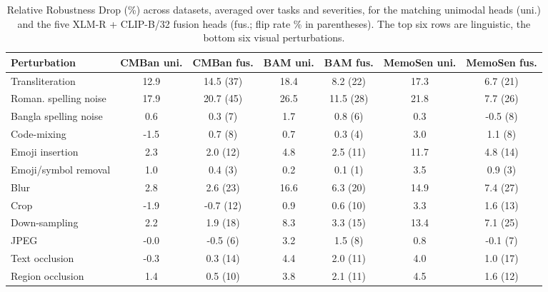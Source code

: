 \begin{table}[t]
\centering
\small
\caption{Relative Robustness Drop (\%) across datasets, averaged over tasks and severities, for the matching unimodal heads (uni.) and the five XLM-R + CLIP-B/32 fusion heads (fus.; flip rate \% in parentheses). The top six rows are linguistic, the bottom six visual perturbations.}
\label{tab:cross_rob}
\begin{adjustbox}{max width=\textwidth}
\begin{tabular}{lcccccc}
\toprule
Perturbation & CMBan uni. & CMBan fus. & BAM uni. & BAM fus. & MemoSen uni. & MemoSen fus. \\
\midrule
Transliteration & 12.9 & 14.5 (37) & 18.4 & 8.2 (22) & 17.3 & 6.7 (21) \\
Roman. spelling noise & 17.9 & 20.7 (45) & 26.5 & 11.5 (28) & 21.8 & 7.7 (26) \\
Bangla spelling noise & 0.6 & 0.3 (7) & 1.7 & 0.8 (6) & 0.3 & -0.5 (8) \\
Code-mixing & -1.5 & 0.7 (8) & 0.7 & 0.3 (4) & 3.0 & 1.1 (8) \\
Emoji insertion & 2.3 & 2.0 (12) & 4.8 & 2.5 (11) & 11.7 & 4.8 (14) \\
Emoji/symbol removal & 1.0 & 0.4 (3) & 0.2 & 0.1 (1) & 3.5 & 0.9 (3) \\
Blur & 2.8 & 2.6 (23) & 16.6 & 6.3 (20) & 14.9 & 7.4 (27) \\
Crop & -1.9 & -0.7 (12) & 0.9 & 0.6 (10) & 3.3 & 1.6 (13) \\
Down-sampling & 2.2 & 1.9 (18) & 8.3 & 3.3 (15) & 13.4 & 7.1 (25) \\
JPEG & -0.0 & -0.5 (6) & 3.2 & 1.5 (8) & 0.8 & -0.1 (7) \\
Text occlusion & -0.3 & 0.3 (14) & 4.4 & 2.0 (11) & 4.0 & 1.0 (17) \\
Region occlusion & 1.4 & 0.5 (10) & 3.8 & 2.1 (11) & 4.5 & 1.6 (12) \\
\bottomrule
\end{tabular}
\end{adjustbox}
\end{table}
